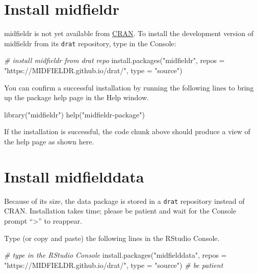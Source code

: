 \documentclass[
]{book}
\newenvironment{Shaded}{\begin{snugshade}}{\end{snugshade}}
\newcommand{\AttributeTok}[1]{\textcolor[rgb]{0.77,0.63,0.00}{#1}}
\newcommand{\CommentTok}[1]{\textcolor[rgb]{0.56,0.35,0.01}{\textit{#1}}}
\newcommand{\FunctionTok}[1]{\textcolor[rgb]{0.00,0.00,0.00}{#1}}
\newcommand{\NormalTok}[1]{#1}
\newcommand{\StringTok}[1]{\textcolor[rgb]{0.31,0.60,0.02}{#1}}
\begin{document}
\hypertarget{install-midfieldr}{%
\section{Install midfieldr}\label{install-midfieldr}}

midfieldr is not yet available from \href{https://cran.r-project.org/}{CRAN}. To install the development version of midfieldr from its \texttt{drat} repository, type in the Console:

\begin{Shaded}
\begin{Highlighting}[]
\CommentTok{\# install midfieldr from drat repo}
\FunctionTok{install.packages}\NormalTok{(}\StringTok{"midfieldr"}\NormalTok{, }
                 \AttributeTok{repos =} \StringTok{"https://MIDFIELDR.github.io/drat/"}\NormalTok{, }
                 \AttributeTok{type =} \StringTok{"source"}\NormalTok{)}
\end{Highlighting}
\end{Shaded}

You can confirm a successful installation by running the following lines to bring up the package help page in the Help window.

\begin{Shaded}
\begin{Highlighting}[]
\FunctionTok{library}\NormalTok{(}\StringTok{"midfieldr"}\NormalTok{)}
\FunctionTok{help}\NormalTok{(}\StringTok{"midfieldr{-}package"}\NormalTok{)}
\end{Highlighting}
\end{Shaded}

If the installation is successful, the code chunk above should produce a view of the help page as shown here.

\hypertarget{install-midfielddata}{%
\section{Install midfielddata}\label{install-midfielddata}}

Because of its size, the data package is stored in a \texttt{drat} repository instead of CRAN. Installation takes time; please be patient and wait for the Console prompt ``\textgreater{}'' to reappear.

Type (or copy and paste) the following lines in the RStudio Console.

\begin{Shaded}
\begin{Highlighting}[]
\CommentTok{\# type in the RStudio Console  }
\FunctionTok{install.packages}\NormalTok{(}\StringTok{"midfielddata"}\NormalTok{, }
                 \AttributeTok{repos =} \StringTok{"https://MIDFIELDR.github.io/drat/"}\NormalTok{, }
                 \AttributeTok{type =} \StringTok{"source"}\NormalTok{)}
\CommentTok{\# be patient}
\end{Highlighting}
\end{Shaded}
\end{document}
